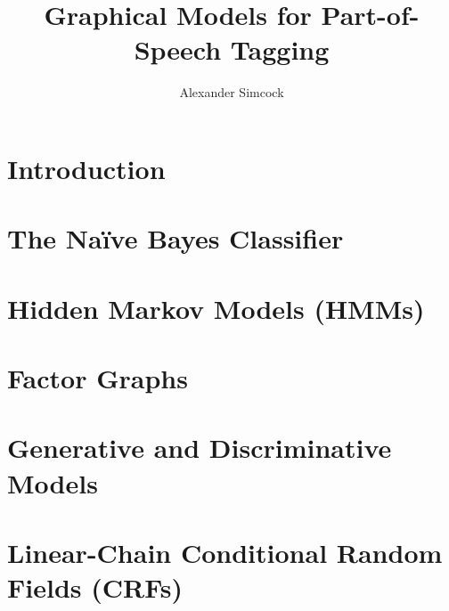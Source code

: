 \documentclass[12pt]{article}
\title{Graphical Models for Part-of-Speech Tagging} %
\author{Alexander Simcock}
\date{}
\begin{document}





\maketitle

\section{Introduction}


\section{The Na{\"i}ve Bayes Classifier}


\section{Hidden Markov Models (HMMs)}


\section{Factor Graphs}


\section{Generative and Discriminative Models}


\section{Linear-Chain Conditional Random Fields (CRFs)}


\printbibliography
\end{document}
